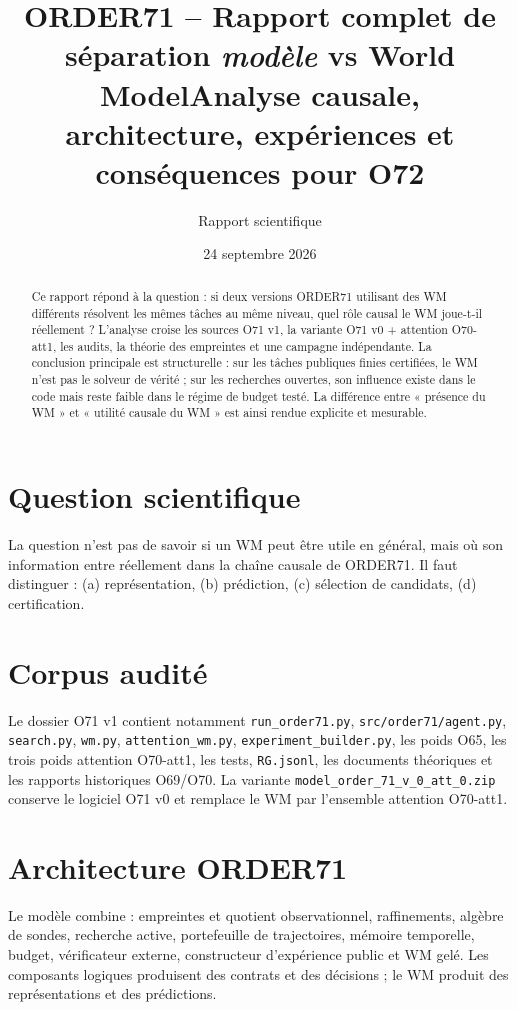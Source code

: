 \documentclass[11pt,a4paper]{article}
\title{ORDER71 -- Rapport complet de séparation \textit{modèle} vs World Model\newline\large Analyse causale, architecture, expériences et conséquences pour O72}
\author{Rapport scientifique}
\date{24 septembre 2026}
\begin{document}
\maketitle
\begin{abstract}
Ce rapport répond à la question : si deux versions ORDER71 utilisant des WM différents résolvent les mêmes tâches au même niveau, quel rôle causal le WM joue-t-il réellement ? L'analyse croise les sources O71 v1, la variante O71 v0 + attention O70-att1, les audits, la théorie des empreintes et une campagne indépendante. La conclusion principale est structurelle : sur les tâches publiques finies certifiées, le WM n'est pas le solveur de vérité ; sur les recherches ouvertes, son influence existe dans le code mais reste faible dans le régime de budget testé. La différence entre « présence du WM » et « utilité causale du WM » est ainsi rendue explicite et mesurable.
\end{abstract}
\tableofcontents
\section{Question scientifique}
La question n'est pas de savoir si un WM peut être utile en général, mais où son information entre réellement dans la chaîne causale de ORDER71. Il faut distinguer : (a) représentation, (b) prédiction, (c) sélection de candidats, (d) certification.
\section{Corpus audité}
Le dossier O71 v1 contient notamment \texttt{run\_order71.py}, \texttt{src/order71/agent.py}, \texttt{search.py}, \texttt{wm.py}, \texttt{attention\_wm.py}, \texttt{experiment\_builder.py}, les poids O65, les trois poids attention O70-att1, les tests, \texttt{RG.jsonl}, les documents théoriques et les rapports historiques O69/O70. La variante \texttt{model\_order\_71\_v\_0\_att\_0.zip} conserve le logiciel O71 v0 et remplace le WM par l'ensemble attention O70-att1.
\section{Architecture ORDER71}
Le modèle combine : empreintes et quotient observationnel, raffinements, algèbre de sondes, recherche active, portefeuille de trajectoires, mémoire temporelle, budget, vérificateur externe, constructeur d'expérience public et WM gelé. Les composants logiques produisent des contrats et des décisions ; le WM produit des représentations et des prédictions.
\end{document}
